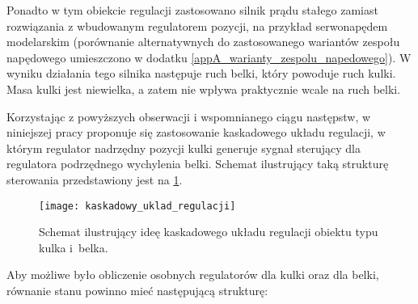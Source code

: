 Ponadto w tym obiekcie regulacji zastosowano silnik prądu stałego zamiast rozwiązania z wbudowanym regulatorem pozycji, na przykład serwonapędem modelarskim (porównanie alternatywnych do zastosowanego wariantów zespołu napędowego umieszczono w dodatku \ref{appA_warianty_zespolu_napedowego}). W wyniku dzia\-łania tego silnika następuje ruch belki, który powoduje ruch kulki. Masa kulki jest niewielka, a zatem nie wpływa praktycznie wcale na ruch belki.

Korzystając z powyższych obserwacji i wspomnianego ciągu następstw, w niniejszej pracy proponuje się zastosowanie kaskadowego układu regulacji, w którym regulator nadrzędny pozycji kulki generuje sygnał sterujący dla regulatora podrzędnego wychylenia belki. Schemat ilustrujący taką strukturę sterowania przedstawiony jest na \cref{fig:kaskadowy_uklad_regulacji}.

\begin{figure}[h]
    \centering
    \texttt{[image: kaskadowy\_uklad\_regulacji]}
    \caption{Schemat ilustrujący ideę kaskadowego układu regulacji obiektu typu kulka i~belka.}
    \label{fig:kaskadowy_uklad_regulacji}
\end{figure}

Aby możliwe było obliczenie osobnych regulatorów dla kulki oraz dla belki, równanie stanu powinno mieć następującą strukturę:

